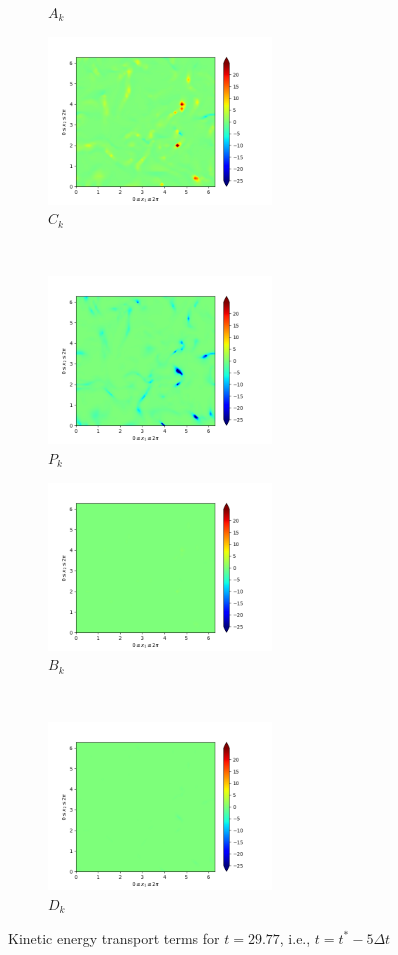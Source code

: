 \begin{figure}[H]
\begin{subfigure}{0.45\textwidth}
        \caption{$A_{k}$}
    \end{subfigure}
    \newline
    \begin{subfigure}{0.45\textwidth}
        \includegraphics[height=1.75in]{media/run-cds-65/C-ke-1335.png}
        \caption{$C_{k}$}
    \end{subfigure}
    ~
    \begin{subfigure}{0.45\textwidth}
        \includegraphics[height=1.75in]{media/run-cds-65/P-ke-1335.png}
        \caption{$P_{k}$}
    \end{subfigure}
    \newline
    \begin{subfigure}{0.45\textwidth}
        \includegraphics[height=1.75in]{media/run-cds-65/B-ke-1335.png}
        \caption{$B_{k}$}
    \end{subfigure}
    ~
    \begin{subfigure}{0.45\textwidth}
        \includegraphics[height=1.75in]{media/run-cds-65/D-ke-1335.png}
        \caption{$D_{k}$}
    \end{subfigure}
    \caption{Kinetic energy transport terms for $t=29.77$, i.e., $t=t^{\ast} -5 \Delta t$}
\end{figure}

